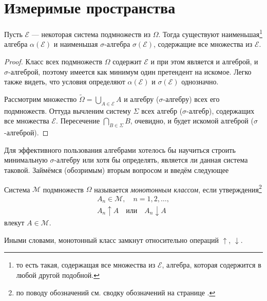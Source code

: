 \section{Измеримые пространства}
\begin{lemma}
  Пусть $ \mathscr E $ --- некоторая система подмножеств из $ \Omega $. Тогда
  существуют наименьшая\footnote{то есть такая, содержащая все множества из $
  \mathscr E $, алгебра, которая содержится в любой другой подобной.} алгебра $ \alpha(\mathscr E) $ и наименьшая $ \sigma
  $-алгебра $ \sigma(\mathscr E) $, содержащие все множества из $ \mathscr E $.
\end{lemma}
\begin{proof}
  Класс всех подмножеств $ \Omega $ содержит $ \mathscr E $ и при этом является
  и алгеброй, и $ \sigma $-алгеброй, поэтому имеется как минимум один претендент
  на искомое. Легко также видеть, что условия определяют $ \alpha(\mathscr E) $
  и $ \sigma(\mathscr E) $ однозначно. 

  Рассмотрим множество $ \widetilde \Omega = \bigcup\limits_{A\in\mathscr E} A $ и алгебру ($ \sigma
  $-алгебру) всех его подмножеств. Оттуда вычленим систему $ \Sigma $ всех
  алгебр ($ \sigma $-алгебр), содержащих все множества $ \mathscr E $.
  Пересечение $ \bigcap\limits_{B\in\Sigma} B $, очевидно, и будет искомой алгеброй ($
  \sigma $-алгеброй).
\end{proof}

Для эффективного пользования алгебрами хотелось бы научиться строить минимальную
$ \sigma $-алгебру или хотя бы определять, является ли данная система таковой.
Займёмся (обозримым) вторым вопросом и введём следующее
\begin{definition}
  Система $ \mathscr M $ подмножеств $ \Omega $ называется \emph{монотонным
  классом}, если утверждения\footnote{по поводу обозначений см. сводку
  обозначений на странице \pageref{sec:tos}.}
  \begin{gather*}
      A_n \in \mathscr M, \quad n=1,2,\ldots,\\
      A_n \uparrow A \quad\text{или}\quad A_n \downarrow A
  \end{gather*}
  влекут $ A \in \mathscr M $.

  Иными словами, монотонный класс замкнут относительно операций $ \uparrow $, $
  \downarrow$.
\end{definition}

